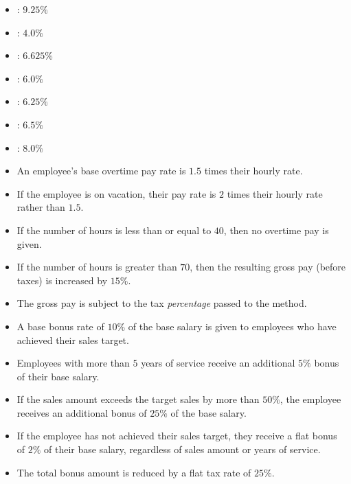 \begin{itemize}
    \item {}: $9.25\%$
    \item {}: $4.0\%$
    \item {}: $6.625\%$
    \item {}: $6.0\%$
    \item {}: $6.25\%$
    \item {}: $6.5\%$
    \item {}: $8.0\%$
\end{itemize}

\begin{itemize}
    \item An employee's base overtime pay rate is $1.5$ times their hourly rate.
    \item If the employee is on vacation, their pay rate is $2$ times their hourly rate rather than $1.5$.
    \item If the number of hours is less than or equal to $40$, then no overtime pay is given.
    \item If the number of hours is greater than $70$, then the resulting gross pay (before taxes) is increased by $15\%$.
    \item The gross pay is subject to the tax \emph{percentage} passed to the method. 
\end{itemize}

\begin{itemize}
    \item A base bonus rate of $10\%$ of the base salary is given to employees who have achieved their sales target.
    \item Employees with more than $5$ years of service receive an additional $5\%$ bonus of their base salary.
    \item If the sales amount exceeds the target sales by more than $50\%$, the employee receives an additional bonus of $25\%$ of the base salary.
    \item If the employee has not achieved their sales target, they receive a flat bonus of $2\%$ of their base salary, regardless of sales amount or years of service.
    \item The total bonus amount is reduced by a flat tax rate of $25\%$.
\end{itemize}

